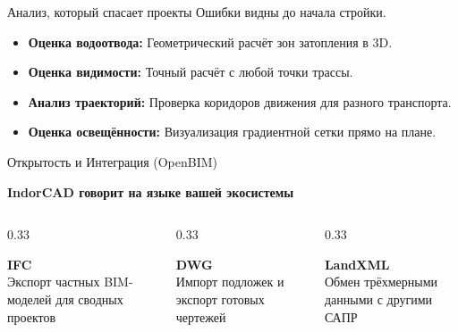 \documentclass[aspectratio=169]{beamer}
\begin{document}
\begin{frame}{Анализ, который спасает проекты}
    \Large
    \textcolor{NeonCyan}{Ошибки видны до начала стройки.}
    \vspace{0.5cm}
    \normalsize
    \begin{itemize}
        \item \textbf{Оценка водоотвода:} Геометрический расчёт зон затопления в 3D.
        \item \textbf{Оценка видимости:} Точный расчёт с любой точки трассы.
        \item \textbf{Анализ траекторий:} Проверка коридоров движения для разного транспорта.
        \item \textbf{Оценка освещённости:} Визуализация градиентной сетки прямо на плане.
    \end{itemize}
\end{frame}

\begin{frame}{Открытость и Интеграция (OpenBIM)}
    \begin{center}
        \textbf{\Large IndorCAD говорит на языке вашей экосистемы}
    \end{center}
    \vspace{0.5cm}
    \begin{columns}
        \begin{column}{0.33\textwidth}
            \begin{center}
                \textcolor{NeonCyan}{\textbf{\Large IFC}} \\
                \vspace{0.2cm}
                Экспорт частных BIM-моделей для сводных проектов
            \end{center}
        \end{column}
        \begin{column}{0.33\textwidth}
            \begin{center}
                \textcolor{VibrantOrange}{\textbf{\Large DWG}} \\
                \vspace{0.2cm}
                Импорт подложек и экспорт готовых чертежей
            \end{center}
        \end{column}
        \begin{column}{0.33\textwidth}
            \begin{center}
                \textcolor{NeonCyan}{\textbf{\Large LandXML}} \\
                \vspace{0.2cm}
                Обмен трёхмерными данными с другими САПР
            \end{center}
        \end{column}
    \end{columns}
\end{frame}
\end{document}
